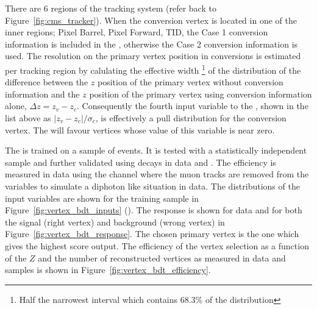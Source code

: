There are 6 regions of the tracking system (refer back to Figure~\ref{fig:cms_tracker}). When the conversion vertex is located in one of the inner regions; Pixel Barrel, Pixel Forward, TID, the Case 1 
conversion information is included in the \BDT, otherwise the Case 2 conversion information is used. The resolution on the primary vertex position in conversions is estimated per tracking region by calulating the effective width \footnote{Half the narrowest interval which contains 68.3\% of the distribution} of the distribution of the difference between the $z$ position of the primary vertex without conversion information and the $z$ position of the primary vertex using conversion information alone, $\Delta z=z_{v}-z_{c}$. Consequently the fourth input variable to the \BDT, shown in the list above as $|z_{v}-z_{c}|/\sigma_{c}$, is effectively a pull distribution for the conversion vertex. The \BDT will favour vertices whose value of this variable is near zero.

The \BDT is trained on a sample of \Hgg \MC events. It is tested with a statistically independent sample and further validated using \Zmumu decays in data and \MC. The efficiency is measured in data using the \Zmumu channel where the muon tracks are removed from the \BDT variables to simulate a diphoton like situation in data. The distributions of the input variables are shown for the \Hgg training sample in Figure~\ref{fig:vertex_bdt_inputs} (). The \BDT response is shown for \Zmumu data and \MC for both the signal (right vertex) and background (wrong vertex) in Figure~\ref{fig:vertex_bdt_response}. The chosen primary vertex is the one which gives the highest score \BDT output. The efficiency of the vertex selection as a function of the $Z$ \pT and the number of reconstructed vertices as measured in \Zmumu data and \MC samples is shown in Figure~\ref{fig:vertex_bdt_efficiency}. 

